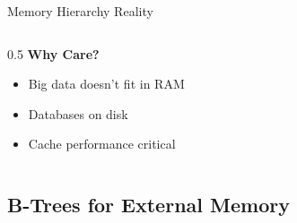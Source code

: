 \documentclass[aspectratio=169,xcolor=dvipsnames]{beamer}
\begin{document}
\begin{frame}{Memory Hierarchy Reality}
\begin{columns}
\begin{column}{0.5\textwidth}
      \vspace{0.3cm}
      \textbf{Why Care?}
      \begin{itemize}
        \item Big data doesn't fit in RAM
        \item Databases on disk
        \item Cache performance critical
      \end{itemize}
    \end{column}
  \end{columns}
\end{frame}

\subsection{B-Trees for External Memory}
\end{document}
